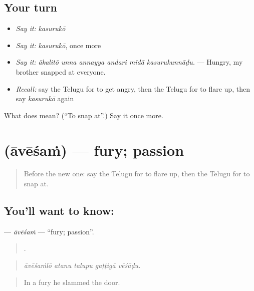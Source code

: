\subsection*{Your turn}
\begin{itemize}
\raggedright
  \item \emph{Say it:} \emph{kasurukō}
  \item \emph{Say it:} \emph{kasurukō}, once more
  \item \emph{Say it:} \emph{ākalitō unna annayya andari mīdā kasurukunnāḍu.} — Hungry, my brother snapped at everyone.
  \item \emph{Recall:} say the Telugu for to get angry, then the Telugu for to flare up, then say \emph{kasurukō} again
\end{itemize}

\begin{tcolorbox}[breakable,colback=teal!4,colframe=teal!35!black,title={Before you move on}]
What does  mean? (\textquotedblleft{}To snap at\textquotedblright{}.) Say it once more.
\end{tcolorbox}
\section[\texorpdfstring{\te{ఆవేశం} (āvēśaṁ)}{ఆవేశం (āvēśaṁ)}]{ (āvēśaṁ) — fury; passion}

\label{lesson:TE-C497-avesam}



\begin{quote}
Before the new one: say the Telugu for to flare up, then the Telugu for to snap at.
\end{quote}

\subsection*{You'll want to know: }
\textbf{} — \emph{āvēśaṁ} — \textquotedblleft{}fury; passion\textquotedblright{}.

\begin{quote}
    .
\end{quote}

\begin{quote}
\emph{āvēśaṁlō atanu talupu gaṭṭigā vēśāḍu.}
\end{quote}

\begin{quote}
In a fury he slammed the door.
\end{quote}

